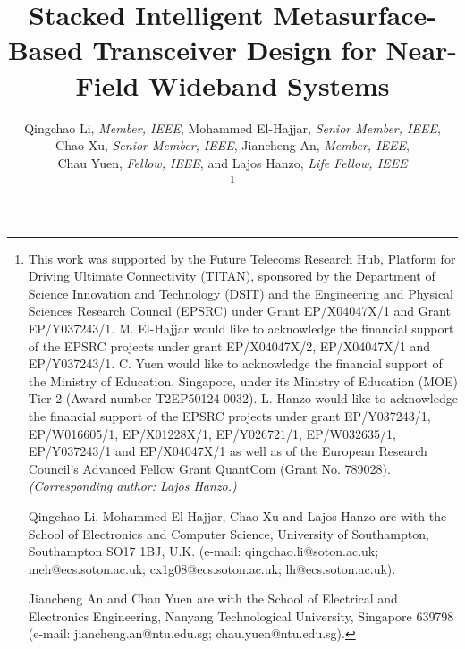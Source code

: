 \documentclass[lettersize,journal]{IEEEtran}
\theoremstyle{remark}
\begin{document}
\title{Stacked Intelligent Metasurface-Based Transceiver Design for Near-Field Wideband Systems}
\author{Qingchao Li, \textit{Member, IEEE},
Mohammed El-Hajjar, \textit{Senior Member, IEEE},\\
Chao Xu, \textit{Senior Member, IEEE},
Jiancheng An, \textit{Member, IEEE},\\
Chau Yuen, \textit{Fellow, IEEE},
and Lajos Hanzo, \textit{Life Fellow, IEEE}

\thanks{This work was supported by the Future Telecoms Research Hub, Platform for Driving Ultimate Connectivity (TITAN), sponsored by the Department of Science Innovation and Technology (DSIT) and the Engineering and Physical Sciences Research Council (EPSRC) under Grant EP/X04047X/1 and Grant EP/Y037243/1. M. El-Hajjar would like to acknowledge the financial support of the EPSRC projects under grant EP/X04047X/2, EP/X04047X/1 and EP/Y037243/1. C. Yuen would like to acknowledge the financial support of the Ministry of Education, Singapore, under its Ministry of Education (MOE) Tier 2 (Award number T2EP50124-0032). L. Hanzo would like to acknowledge the financial support of the EPSRC projects under grant EP/Y037243/1, EP/W016605/1, EP/X01228X/1, EP/Y026721/1, EP/W032635/1, EP/Y037243/1 and EP/X04047X/1 as well as of the European Research Council's Advanced Fellow Grant QuantCom (Grant No. 789028). \textit{(Corresponding author: Lajos Hanzo.)}

Qingchao Li, Mohammed El-Hajjar, Chao Xu and Lajos Hanzo are with the School of Electronics and Computer Science, University of Southampton, Southampton SO17 1BJ, U.K. (e-mail: qingchao.li@soton.ac.uk; meh@ecs.soton.ac.uk; cx1g08@ecs.soton.ac.uk; lh@ecs.soton.ac.uk).

Jiancheng An and Chau Yuen are with the School of Electrical and Electronics Engineering, Nanyang Technological University, Singapore 639798 (e-mail: jiancheng.an@ntu.edu.sg; chau.yuen@ntu.edu.sg).}}

\maketitle
\end{document}
